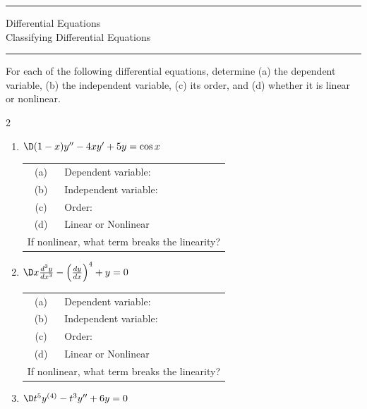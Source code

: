 \documentclass[12pt]{amsart}
\newcommand{\BACKROOT}{../../../..}
\newcommand{\TEACHINGROOT}{\BACKROOT}
\newcommand{\PATHTOHEADERS}{\TEACHINGROOT/Headers}
\numberwithin{equation}{section}
\begin{document}


\pagestyle{empty}

\noindent\rule{7.6in}{0.4pt}

{\centering\sc 
\noindent Differential Equations\\
 Classifying Differential Equations \\
}
\noindent\rule{7.6in}{0.4pt}

\vspace{0.1cm}

\noindent For each of the following differential equations, determine (a) the dependent variable, (b) the independent variable, (c) its order, and (d) whether
it is linear or nonlinear. 
\begin{multicols}{2}
\begin{enumerate}[1.]
\item  $\D (1 - x)y'' - 4xy' + 5y = \cos x$

\setlength{\extrarowheight}{0.1cm}
\begin{tabular}{cl}
	(a) & Dependent variable:\\
	(b) & Independent variable:\\
	(c) & Order:\\
	(d) & Linear or Nonlinear \\
	\multicolumn{2}{l}{If nonlinear, what term breaks the linearity?} \\
\end{tabular}

\vspace{1.2cm}

\item  $\D x \frac{d^3y}{dx^3} - \left( \frac{dy}{dx} \right)^4 + y = 0$\\

\setlength{\extrarowheight}{0.1cm}
\begin{tabular}{cl}
	(a) & Dependent variable:\\
	(b) & Independent variable:\\
	(c) & Order:\\
	(d) & Linear or Nonlinear \\
	\multicolumn{2}{l}{If nonlinear, what term breaks the linearity?} \\
\end{tabular}

\vspace{1.2cm}

\item  $\D t^5 y^{(4)} - t^3 y'' + 6y = 0$\\


\end{enumerate}
\end{multicols}
\end{document}
